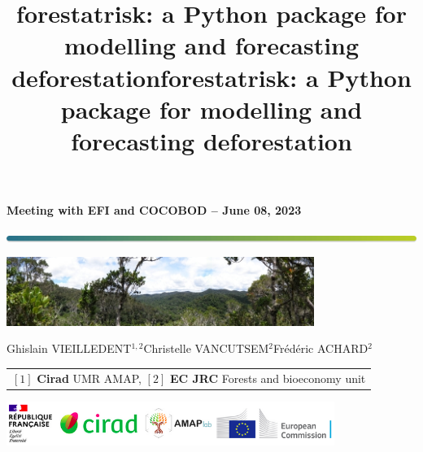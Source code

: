 \documentclass[10pt,table,dvipsnames,compress]{beamer}
\date{}
\title{forestatrisk: a Python package for modelling and forecasting deforestation}
\title[forestatrisk]{forestatrisk: a Python package for modelling and forecasting deforestation}
\begin{document}

{
  \begin{frame}
  \begin{center}
  \small{\textbf{Meeting with EFI and COCOBOD -- June 08, 2023}}
  \end{center}
  \vspace{-0.5cm}
  \titlepage %
  \vspace{-3cm}
  \begin{center}
    \includegraphics[width=\textwidth]{figs/Barre_couleur}
    
    \vspace{0.25cm}
    
    \includegraphics[width=10cm]{figs/Banniere}
    
    \small{Ghislain VIEILLEDENT$^{1, 2}$\hspace{0.25cm}Christelle VANCUTSEM$^{2}$\hspace{0.25cm}Frédéric ACHARD$^{2}$}
      
    \vspace{0.25cm}
    
    {\scriptsize
      \begin{tabular}{l}
        $[1]$ \textbf{Cirad} UMR AMAP, $[2]$ \textbf{EC JRC} Forests and bioeconomy unit
      \end{tabular}
    }
    
    \includegraphics[width=0.8\textwidth]{figs/partners_logos}
    
  \end{center}
  \end{frame}
}
\end{document}

